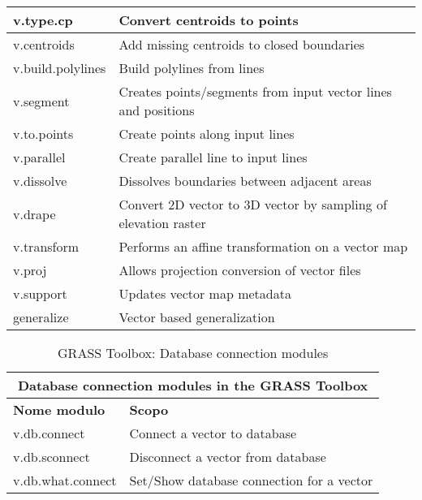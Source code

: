 \begin{table}[ht]
\begin{tabular}{|p{4cm}|p{12cm}|}
  \hline v.type.cp & Convert centroids to points \\
  \hline v.centroids & Add missing centroids to closed boundaries  \\
  \hline v.build.polylines & Build polylines from lines \\
  \hline v.segment & Creates points/segments from input vector lines and
  positions \\
  \hline v.to.points & Create points along input lines \\
  \hline v.parallel & Create parallel line to input lines \\
  \hline v.dissolve & Dissolves boundaries between adjacent areas \\
  \hline v.drape & Convert 2D vector to 3D vector by sampling of elevation
  raster\\
  \hline v.transform & Performs an affine transformation on a vector map \\
  \hline v.proj & Allows projection conversion of vector files \\
  \hline v.support & Updates vector map metadata \\
  \hline generalize & Vector based generalization \\
\hline
\end{tabular}
\end{table}

\begin{table}[ht]
\centering
\caption{GRASS Toolbox: Database connection modules}\medskip
 \begin{tabular}{|p{4cm}|p{12cm}|}
  \hline \multicolumn{2}{|c|}{\textbf{Database connection modules in the GRASS
  Toolbox}} \\
  \hline \textbf{Nome modulo} & \textbf{Scopo} \\
  \hline v.db.connect & Connect a vector to database \\
  \hline v.db.sconnect & Disconnect a vector from database \\
  \hline v.db.what.connect & Set/Show database connection for a vector \\
\hline
\end{tabular}
\end{table}

